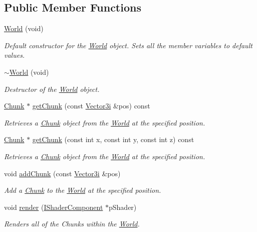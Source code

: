 \subsection*{Public Member Functions}
\begin{DoxyCompactItemize}
\item 
\hyperlink{classsparky_1_1_world_a29fa569fb27b55eb793a442d3d493b60}{World} (void)\hypertarget{classsparky_1_1_world_a29fa569fb27b55eb793a442d3d493b60}{}\label{classsparky_1_1_world_a29fa569fb27b55eb793a442d3d493b60}

\begin{DoxyCompactList}\small\item\em Default constructor for the \hyperlink{classsparky_1_1_world}{World} object. Sets all the member variables to default values. \end{DoxyCompactList}\item 
\hyperlink{classsparky_1_1_world_af8f97ee0ba00d5803b0be8d6e9049e09}{$\sim$\+World} (void)
\begin{DoxyCompactList}\small\item\em Destructor of the \hyperlink{classsparky_1_1_world}{World} object. \end{DoxyCompactList}\item 
\hyperlink{classsparky_1_1_chunk}{Chunk} $\ast$ \hyperlink{classsparky_1_1_world_a69ff5f592e3d8b7a2ff1a5e5f2c3255a}{get\+Chunk} (const \hyperlink{classsparky_1_1_vector3}{Vector3i} \&pos) const 
\begin{DoxyCompactList}\small\item\em Retrieves a \hyperlink{classsparky_1_1_chunk}{Chunk} object from the \hyperlink{classsparky_1_1_world}{World} at the specified position. \end{DoxyCompactList}\item 
\hyperlink{classsparky_1_1_chunk}{Chunk} $\ast$ \hyperlink{classsparky_1_1_world_a7a03696f9ea23c6a9dad10c623e0cfd9}{get\+Chunk} (const int x, const int y, const int z) const 
\begin{DoxyCompactList}\small\item\em Retrieves a \hyperlink{classsparky_1_1_chunk}{Chunk} object from the \hyperlink{classsparky_1_1_world}{World} at the specified position. \end{DoxyCompactList}\item 
void \hyperlink{classsparky_1_1_world_a43c01651253a4cce96590bd72b0a08eb}{add\+Chunk} (const \hyperlink{classsparky_1_1_vector3}{Vector3i} \&pos)
\begin{DoxyCompactList}\small\item\em Add a \hyperlink{classsparky_1_1_chunk}{Chunk} to the \hyperlink{classsparky_1_1_world}{World} at the specified position. \end{DoxyCompactList}\item 
void \hyperlink{classsparky_1_1_world_a787081a16bd8e00747dc75d617990494}{render} (\hyperlink{classsparky_1_1_i_shader_component}{I\+Shader\+Component} $\ast$p\+Shader)
\begin{DoxyCompactList}\small\item\em Renders all of the Chunks within the \hyperlink{classsparky_1_1_world}{World}. \end{DoxyCompactList}\end{DoxyCompactItemize}
